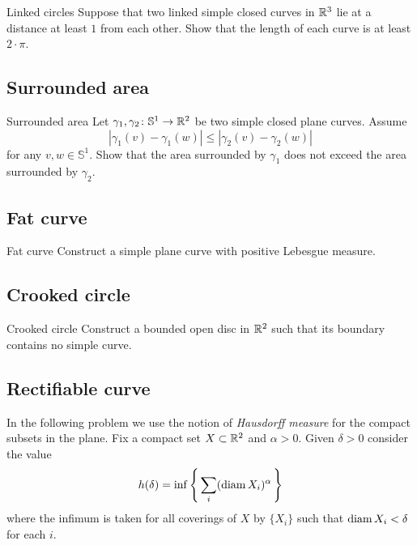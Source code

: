 \begin{pr}{}{Linked circles}\label{linked-circles}
Suppose that two linked  simple closed curves in $\mathbb{R}^3$
lie at a distance at least $1$ from each other.
Show that the length of each curve is at least $2\cdot\pi$.
\end{pr}

\subsection*{Surrounded area}

\begin{pr}{\easy}{Surrounded area}\label{Surrounded area}
Let $\gamma_1,\gamma_2\colon\mathbb S^1\to\mathbb{R}^2$ be two simple closed plane curves.
Assume 
\[|\gamma_1(v)-\gamma_1(w)|\le|\gamma_2(v)-\gamma_2(w)|\]
for any $v,w\in \mathbb S^1$.
Show that the area surrounded by $\gamma_1$ does not exceed the area surrounded by $\gamma_2$. 
\end{pr}

\subsection*{Fat curve}

\begin{pr}{\easy}{Fat curve}\label{Fat curve}
Construct a simple plane curve with positive Lebesgue measure.
\end{pr}


\subsection*{Crooked circle}

\begin{pr}{}{Crooked circle}\label{Crooked circle} 
Construct 
a bounded open disc in $\mathbb{R}^2$ 
such that 
its boundary contains no simple curve.
\end{pr}

\subsection*{Rectifiable curve}

In the following problem we use the notion of 
\emph{Hausdorff measure} for the compact subsets in the plane.
Fix a compact set $X\subset\mathbb{R}^2$ and $\alpha>0$.
Given $\delta>0$ consider the value
\[h(\delta)=\inf\left\{\,\sum_i(\operatorname{\rm diam} X_i)^\alpha\,\right\}\]
where the infimum is taken for all coverings of $X$ by $\{X_i\}$
such that $\operatorname{\rm diam} X_i<\delta$ for each $i$.

